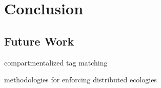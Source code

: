 \chapter{Conclusion}
\label{chap:conclusion}

\section{Future Work}

compartmentalized tag matching

methodologies for enforcing distributed ecologies
